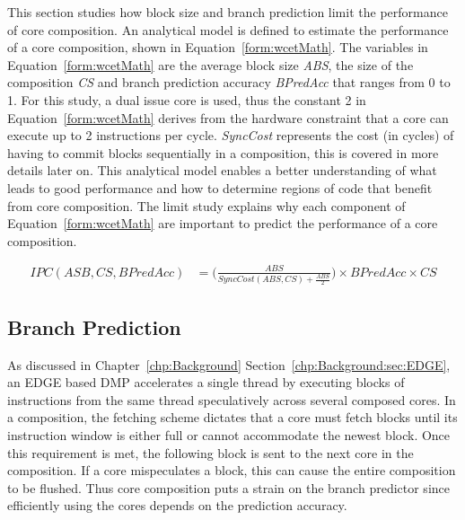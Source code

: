 This section studies how block size and branch prediction limit the performance of core composition.
An analytical model is defined to estimate the performance of a core composition, shown in Equation~\ref{form:wcetMath}.
The variables in Equation~\ref{form:wcetMath} are the average block size \textit{ABS},  the size of the composition \textit{CS} and branch prediction accuracy \textit{BPredAcc} that ranges from 0 to 1.
For this study, a dual issue core is used, thus the constant 2 in Equation~\ref{form:wcetMath} derives from the hardware constraint that a core can execute up to 2 instructions per cycle.
\textit{SyncCost} represents the cost (in cycles) of having to commit blocks sequentially in a composition, this is covered in more details later on.
This analytical model enables a better understanding of what leads to good performance and how to determine regions of code that benefit from core composition.
The limit study explains why each component of Equation~\ref{form:wcetMath} are important to predict the performance of a core composition.

\begin{align}\label{form:wcetMath}
IPC(ASB,CS,BPredAcc) &= \bigg(\frac{ABS}{SyncCost(ABS,CS) + {\frac{ABS}{2}}}\bigg) \times BPredAcc \times CS
\end{align}


\subsection{Branch Prediction}

As discussed in Chapter~\ref{chp:Background} Section~\ref{chp:Background:sec:EDGE}, an EDGE based DMP accelerates a single thread by executing blocks of instructions from the same thread speculatively across several composed cores. 
In a composition, the fetching scheme dictates that a core must fetch blocks until its instruction window is either full or cannot accommodate the newest block.
Once this requirement is met, the following block is sent to the next core in the composition.
If a core mispeculates a block, this can cause the entire composition to be flushed.
Thus core composition puts a strain on the branch predictor since efficiently using the cores depends on the prediction accuracy.

